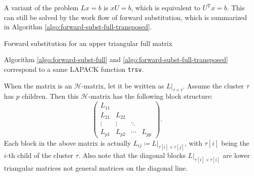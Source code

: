 \documentclass[11pt, a4paper]{book}
\begin{document}
A variant of the problem $Lx=b$ is $xU = b$, which is equivalent to $U^{\mathrm{T}}x = b$.
This can still be solved by the work flow of forward substitution, which is summarized in Algorithm \ref{algo:forward-subst-full-transposed}.
\begin{breakablealgorithm}
  \label{algo:forward-subst-full-transposed}
  \caption{Forward substitution for an upper triangular full matrix}
  \begin{algorithmic}[1]
        \EndFor
      \EndFor
    \EndProcedure
  \end{algorithmic}
\end{breakablealgorithm}

Algorithm \ref{algo:forward-subst-full} and \ref{algo:forward-subst-full-transposed}
correspond to a same LAPACK function \texttt{trsv}.

When the matrix is an $\mathcal{H}$-matrix, let it be written as
$L\big\vert_{\tau\times \tau}$. Assume the cluster $\tau$ has $p$ children. Then this
$\mathcal{H}$-matrix has the following block structure:
\begin{equation}
  \begin{pmatrix}
    L_{11} & & & \\
    L_{21} & L_{22} & & \\
    \vdots & \vdots & \ddots & \\
    L_{p1} & L_{p2} & \cdots & L_{pp}
  \end{pmatrix}.
\end{equation}
Each block in the above matrix is actually
$L_{ij} \coloneqq L\big\vert_{\tau[i]\times\tau[j]}$, with $\tau[i]$ being the $i$-th
child of the cluster $\tau$. Also note that the diagonal blocks
$L\big\vert_{\tau[i]\times\tau[i]}$ are lower triangular matrices not general matrices on
the diagonal line.
\end{document}
